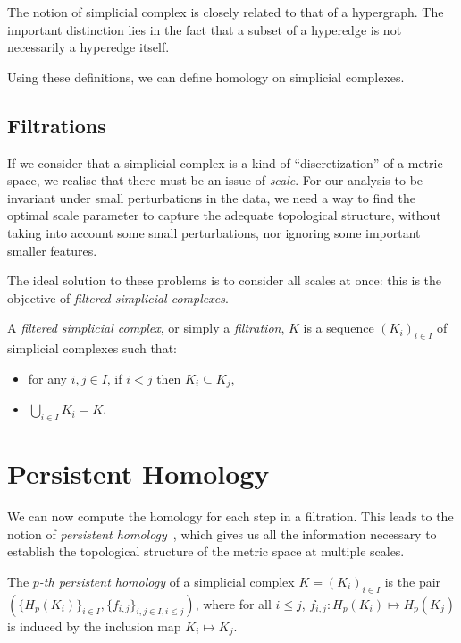 \documentclass[a4paper,11pt,openany,extrafontsizes]{memoir}
\begin{document}
The notion of simplicial complex is closely related to that of a
hypergraph. The important distinction lies in the fact that a subset
of a hyperedge is not necessarily a hyperedge itself.

Using these definitions, we can define homology on simplicial
complexes. %

\subsection{Filtrations}%
\label{sec:filtrations}

If we consider that a simplicial complex is a kind of
``discretization'' of a metric space, we realise that there must be an
issue of \emph{scale}. For our analysis to be invariant under small
perturbations in the data, we need a way to find the optimal scale
parameter to capture the adequate topological structure, without
taking into account some small perturbations, nor ignoring some
important smaller features.


The ideal solution to these problems is to consider all scales at
once: this is the objective of \emph{filtered simplicial complexes}.

\begin{defn}[Filtration]
  A \emph{filtered simplicial complex}, or simply a \emph{filtration},
  $K$ is a sequence ${(K_i)}_{i\in I}$ of simplicial complexes such
  that:
  \begin{itemize}
  \item for any $i, j \in I$, if $i < j$ then $K_i \subseteq K_j$,
  \item $\bigcup_{i\in I} K_i = K$.
  \end{itemize}
\end{defn}

\section{Persistent Homology}%
\label{sec:persistent-homology}

We can now compute the homology for each step in a filtration. This
leads to the notion of \emph{persistent
  homology}~\cite{carlsson_topology_2009,zomorodian_computing_2005},
which gives us all the information necessary to establish the
topological structure of the metric space at multiple scales.

\begin{defn}
  The \emph{$p$-th persistent homology} of a simplicial complex
  $K = {(K_i)}_{i\in I}$ is the pair
  $(\{H_p(K_i)\}_{i\in I}, \{f_{i,j}\}_{i,j\in I, i\leq j})$, where
  for all $i\leq j$, $f_{i,j} : H_p(K_i) \mapsto H_p(K_j)$ is induced
  by the inclusion map $K_i \mapsto K_j$.
\end{defn}
\end{document}
